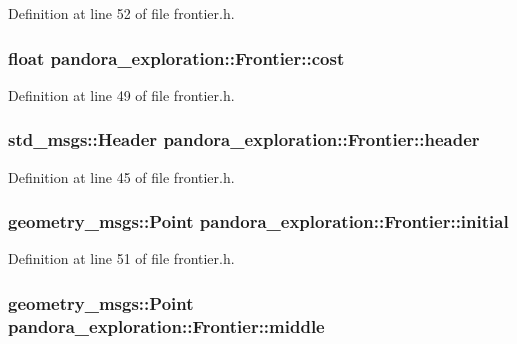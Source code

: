 \-Definition at line 52 of file frontier.\-h.

\hypertarget{classpandora__exploration_1_1_frontier_a117258cc30ad8177066ac19e130d81c2}{
\subsubsection[{cost}]{\setlength{\rightskip}{0pt plus 5cm}float {\bf pandora\-\_\-exploration\-::\-Frontier\-::cost}}}\label{classpandora__exploration_1_1_frontier_a117258cc30ad8177066ac19e130d81c2}


\-Definition at line 49 of file frontier.\-h.

\hypertarget{classpandora__exploration_1_1_frontier_a1719db0e673aeef22055bec72c2acdc7}{
\subsubsection[{header}]{\setlength{\rightskip}{0pt plus 5cm}std\-\_\-msgs\-::\-Header {\bf pandora\-\_\-exploration\-::\-Frontier\-::header}}}\label{classpandora__exploration_1_1_frontier_a1719db0e673aeef22055bec72c2acdc7}


\-Definition at line 45 of file frontier.\-h.

\hypertarget{classpandora__exploration_1_1_frontier_a2f05815cfa7b4d6abd6c6657e9ccae71}{
\subsubsection[{initial}]{\setlength{\rightskip}{0pt plus 5cm}geometry\-\_\-msgs\-::\-Point {\bf pandora\-\_\-exploration\-::\-Frontier\-::initial}}}\label{classpandora__exploration_1_1_frontier_a2f05815cfa7b4d6abd6c6657e9ccae71}


\-Definition at line 51 of file frontier.\-h.

\hypertarget{classpandora__exploration_1_1_frontier_a1aeebbe33da8ce3fd1279b20cbcd264e}{
\subsubsection[{middle}]{\setlength{\rightskip}{0pt plus 5cm}geometry\-\_\-msgs\-::\-Point {\bf pandora\-\_\-exploration\-::\-Frontier\-::middle}}}\label{classpandora__exploration_1_1_frontier_a1aeebbe33da8ce3fd1279b20cbcd264e}


